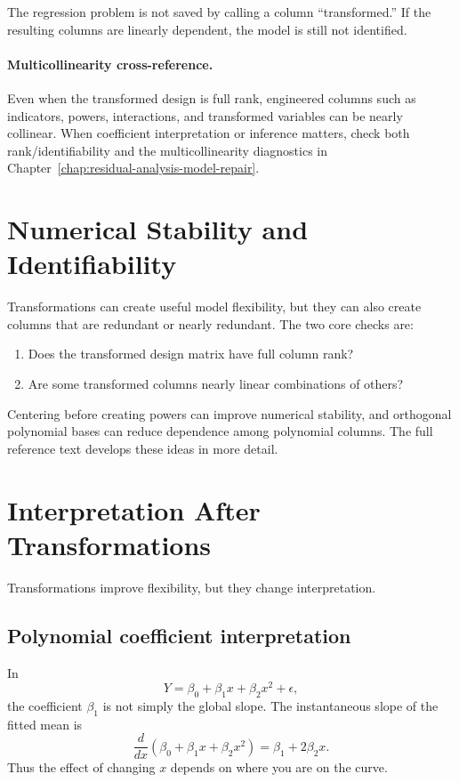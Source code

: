 {The regression problem is not saved by calling a column ``transformed.''  If the resulting columns are linearly dependent, the model is still not identified.

\paragraph{Multicollinearity cross-reference.}
Even when the transformed design is full rank, engineered columns such as indicators, powers, interactions, and transformed variables can be nearly collinear.  When coefficient interpretation or inference matters, check both rank/identifiability and the multicollinearity diagnostics in Chapter~\ref{chap:residual-analysis-model-repair}.
}{
\section{Numerical Stability and Identifiability}

Transformations can create useful model flexibility, but they can also create columns that are redundant or nearly redundant.  The two core checks are:
\begin{enumerate}
  \item Does the transformed design matrix have full column rank?
  \item Are some transformed columns nearly linear combinations of others?
\end{enumerate}
Centering before creating powers can improve numerical stability, and orthogonal polynomial bases can reduce dependence among polynomial columns.  The full reference text develops these ideas in more detail.
}
\section{Interpretation After Transformations}

Transformations improve flexibility, but they change interpretation.

\subsection*{Polynomial coefficient interpretation}

In
\begin{equation}
  Y=\beta_0+\beta_1x+\beta_2x^2+\epsilon,
\end{equation}
the coefficient \(\beta_1\) is not simply the global slope.  The instantaneous slope of the fitted mean is
\begin{equation}
  \frac{d}{dx}\left(\beta_0+\beta_1x+\beta_2x^2\right)
  =\beta_1+2\beta_2x.
\end{equation}
Thus the effect of changing \(x\) depends on where you are on the curve.

